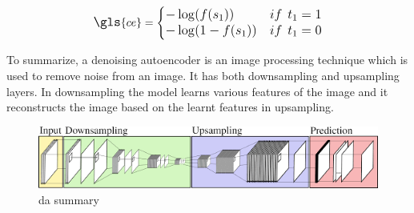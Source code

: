 \begin{equation}
\label{c4:eqn3}
\fontsize{12}{12}\selectfont
\gls{ce} = 
\begin{cases}
  -\log(f(s_{1})) & if \hspace{5pt} t_{1} = 1 \\
  -\log(1 - f(s_{1})) & if \hspace{5pt} t_{1} = 0\\
\end{cases}
\end{equation}

To summarize, a denoising autoencoder is an image processing technique which is used to remove noise from an image. It has both downsampling and upsampling layers. In downsampling the model learns various features of the image and it reconstructs the image based on the learnt features in upsampling.

\begin{figure}[H]
\centering
	\includegraphics[scale=0.9]{Figures/denoise_summary.png}	
	\caption{\acrlong{da} summary}
	\label{fig:denoise_model_summary}
\end{figure}